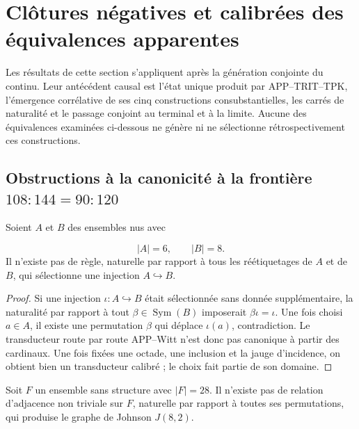 
\section{Clôtures négatives et calibrées des équivalences apparentes}
\label{sec:hmt-final-clausuras-negativas-calibradas}

Les résultats de cette section s'appliquent après la génération conjointe
du continu. Leur antécédent causal est l'état unique produit par
APP--TRIT--TPK, l'émergence corrélative de ses cinq constructions
consubstantielles, les carrés de naturalité et le passage conjoint au terminal
et à la limite. Aucune des équivalences examinées ci-dessous ne génère ni ne
sélectionne rétrospectivement ces constructions.

\subsection{Obstructions à la canonicité à la frontière
\texorpdfstring{\(108{:}144=90{:}120\)}{108:144=90:120}}

\begin{theorem}
\label{thm:hmt-final-no-inclusion-canonica-seis-ocho}
Soient \(A\) et \(B\) des ensembles nus avec

\[
 |A|=6,
 \qquad |B|=8.
\]
Il n'existe pas de règle, naturelle par rapport à tous les réétiquetages de \(A\)
et de \(B\), qui sélectionne une injection \(A\hookrightarrow B\).
\end{theorem}

\begin{proof}
Si une injection \(\iota:A\hookrightarrow B\) était sélectionnée sans donnée
supplémentaire, la naturalité par rapport à tout \(\beta\in\operatorname{Sym}(B)\)
imposerait \(\beta\iota=\iota\). Une fois choisi \(a\in A\), il existe une permutation
\(\beta\) qui déplace \(\iota(a)\), contradiction. Le transducteur
route par route APP--Witt n'est donc pas canonique à partir des cardinaux. Une fois
fixées une octade, une inclusion et la jauge d'incidence, on obtient bien un
transducteur calibré ; le choix fait partie de son domaine.
\end{proof}

\begin{theorem}
\label{thm:hmt-final-no-johnson-desde-cardinal}
Soit \(F\) un ensemble sans structure avec \(|F|=28\). Il n'existe pas de relation
d'adjacence non triviale sur \(F\), naturelle par rapport à toutes ses
permutations, qui produise le graphe de Johnson \(J(8,2)\).
\end{theorem}

